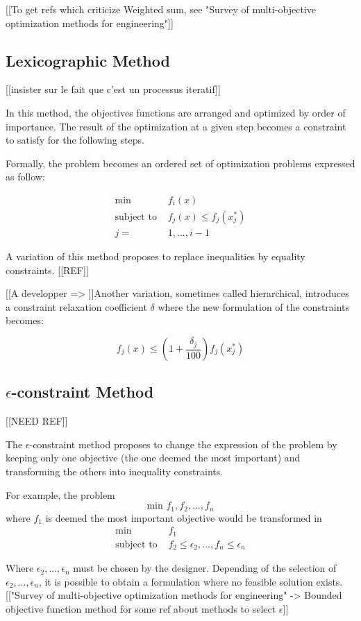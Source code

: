 [[To get refs which criticize Weighted sum, see "Survey of multi-objective optimization methods for engineering"]]

\subsection{Lexicographic Method}

[[insister sur le fait que c'est un processus iteratif]]

In this method, the objectives functions are arranged and optimized by order of importance. The result of the optimization at a given step becomes a constraint to satisfy for the following steps.

Formally, the problem becomes an ordered set of optimization problems expressed as follow:

\begin{align*}
\text{min } &f_i(x) \\
\text{subject to } &f_j(x) \leq f_j(x_j^*) \\
j = &1, ..., i-1
\end{align*}

A variation of this method proposes to replace inequalities by equality constraints. [[REF]]

[[A developper => ]]Another variation, sometimes called hierarchical, introduces a constraint relaxation coefficient $\delta$ where the new formulation of the constraints becomes:

\[ f_j(x) \leq \left(1 + \frac{\delta_j}{100}\right) f_j(x_j^*) \]


\subsection{$\epsilon$-constraint Method}

[[NEED REF]]

The $\epsilon$-constraint method proposes to change the expression of the problem by keeping only one objective (the one deemed the most important) and transforming the others into inequality constraints.

For example, the problem \[\text{min } f_1, f_2, ...,f_n\] where $f_1$ is deemed the most important objective would be transformed in
\begin{align*}
\text{min } &f_1 \\
\text{subject to } &f_2 \leq \epsilon_2, ..., f_n \leq \epsilon_n
\end{align*}

Where $\epsilon_2, ..., \epsilon_n$ must be chosen by the designer.
Depending of the selection of $\epsilon_2, ..., \epsilon_n$, it is possible to obtain a formulation where no feasible solution exists.
[["Survey of multi-objective optimization methods for engineering" -> Bounded objective function method for some ref about methods to select $\epsilon$]]

